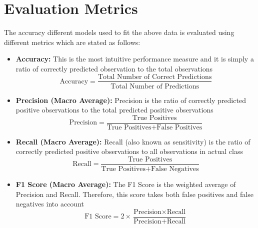\section{Evaluation Metrics}
The accuracy different models used to fit the above data is evaluated using different metrics which are stated as follows:

\begin{itemize}
  \item \textbf{\hypertarget{acc_def}{Accuracy}:} This is the most intuitive performance measure and it is simply a ratio of correctly predicted observation to the total observations
  \[
    \text{Accuracy} = \frac{\text{Total Number of Correct Predictions}}{\text{Total Number of Predictions}}
  \]

  \item \textbf{Precision (Macro Average):} Precision is the ratio of correctly predicted positive observations to the total predicted positive observations
  \[
    \text{Precision} = \frac{\text{True Positives}}{\text{True Positives} + \text{False Positives}}
  \]

  \item \textbf{Recall (Macro Average):} Recall (also known as sensitivity) is the ratio of correctly predicted positive observations to all observations in actual class
  \[
    \text{Recall} = \frac{\text{True Positives}}{\text{True Positives} + \text{False Negatives}}
  \]

  \item \textbf{F1 Score (Macro Average):} The F1 Score is the weighted average of Precision and Recall. Therefore, this score takes both false positives and false negatives into account
  \[
    \text{F1 Score} = 2 \times \frac{\text{Precision} \times \text{Recall}}{\text{Precision} + \text{Recall}}
  \]
\end{itemize}
